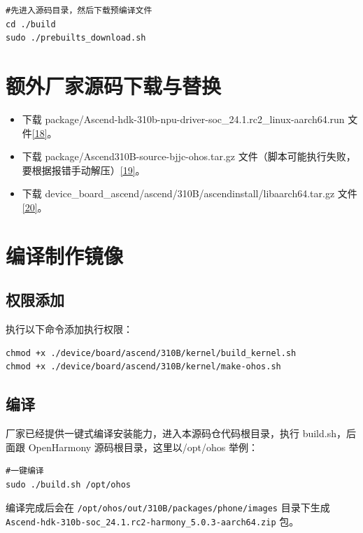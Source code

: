 \begin{lstlisting}[style=shell, caption={下载预编译文件}]
#先进入源码目录，然后下载预编译文件
cd ./build
sudo ./prebuilts_download.sh
\end{lstlisting}

\section{额外厂家源码下载与替换}

\begin{itemize}
  \item 下载 package/Ascend-hdk-310b-npu-driver-soc\_24.1.rc2\_linux-aarch64.run 文件\hyperref[ref:npu-driver]{[18]}。
  \item 下载 package/Ascend310B-source-bjjc-ohos.tar.gz 文件（脚本可能执行失败，要根据报错手动解压）\hyperref[ref:ascend310b-src]{[19]}。
  \item 下载 device\_board\_ascend/ascend/310B/ascendinstall/libaarch64.tar.gz 文件\hyperref[ref:libaarch64]{[20]}。
\end{itemize}


\section{编译制作镜像}

\subsection{权限添加}

执行以下命令添加执行权限：

\begin{lstlisting}[style=shell, caption={添加执行权限}]
chmod +x ./device/board/ascend/310B/kernel/build_kernel.sh
chmod +x ./device/board/ascend/310B/kernel/make-ohos.sh
\end{lstlisting}

\subsection{编译}

厂家已经提供一键式编译安装能力，进入本源码仓代码根目录，执行 build.sh，后面跟 OpenHarmony 源码根目录，这里以/opt/ohos 举例：

\begin{lstlisting}[style=shell, caption={一键编译}]
#一键编译
sudo ./build.sh /opt/ohos
\end{lstlisting}

编译完成后会在 \texttt{/opt/ohos/out/310B/packages/phone/images} 目录下生成 \texttt{Ascend-hdk-310b-soc\_24.1.rc2-harmony\_5.0.3-aarch64.zip} 包。

